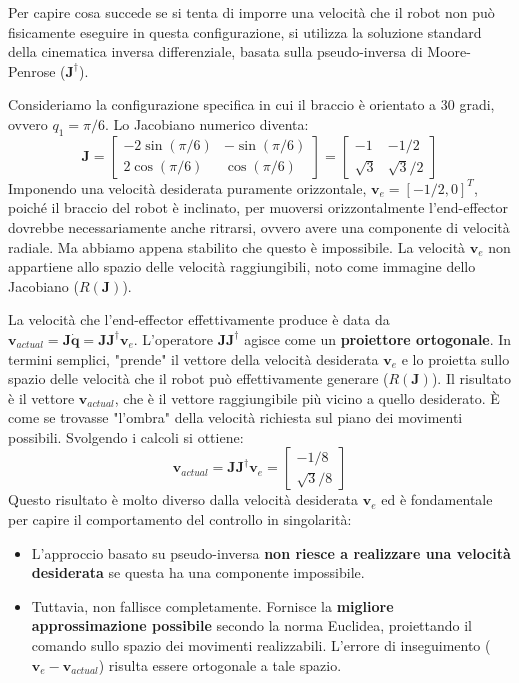 ﻿\documentclass[11pt, a4paper]{article}
\begin{document}
Per capire cosa succede se si tenta di imporre una velocità che il robot non può fisicamente eseguire in questa configurazione, si utilizza la soluzione standard della cinematica inversa differenziale, basata sulla pseudo-inversa di Moore-Penrose ($\bm{J}^\dagger$).

Consideriamo la configurazione specifica in cui il braccio è orientato a 30 gradi, ovvero $q_1 = \pi/6$. Lo Jacobiano numerico diventa:
\[
    \bm{J} = \begin{bmatrix} -2\sin(\pi/6) & -\sin(\pi/6) \\ 2\cos(\pi/6) & \cos(\pi/6) \end{bmatrix} = \begin{bmatrix} -1 & -1/2 \\ \sqrt{3} & \sqrt{3}/2 \end{bmatrix}
\]
Imponendo una velocità desiderata puramente orizzontale, $\bm{v}_e = [-1/2, 0]^T$, poiché il braccio del robot è inclinato, per muoversi orizzontalmente l'end-effector dovrebbe necessariamente anche ritrarsi, ovvero avere una componente di velocità radiale. Ma abbiamo appena stabilito che questo è impossibile. La velocità $\bm{v}_e$ non appartiene allo spazio delle velocità raggiungibili, noto come immagine dello Jacobiano ($R(\bm{J})$).

La velocità che l'end-effector effettivamente produce è data da $\bm{v}_{actual} = \bm{J}\dot{\bm{q}} = \bm{J}\bm{J}^\dagger \bm{v}_e$. L'operatore $\bm{J}\bm{J}^\dagger$ agisce come un \textbf{proiettore ortogonale}. In termini semplici, "prende" il vettore della velocità desiderata $\bm{v}_e$ e lo proietta sullo spazio delle velocità che il robot può effettivamente generare ($R(\bm{J})$). Il risultato è il vettore $\bm{v}_{actual}$, che è il vettore raggiungibile più vicino a quello desiderato. È come se trovasse "l'ombra" della velocità richiesta sul piano dei movimenti possibili.
\newpage
Svolgendo i calcoli si ottiene:
\[
    \bm{v}_{actual} = \bm{J}\bm{J}^\dagger\bm{v}_e =
    \begin{bmatrix}
        -1/8 \\
        \sqrt{3}/8
    \end{bmatrix}
\]
Questo risultato è molto diverso dalla velocità desiderata $\bm{v}_e$ ed è fondamentale per capire il comportamento del controllo in singolarità:
\begin{itemize}
    \item L'approccio basato su pseudo-inversa \textbf{non riesce a realizzare una velocità desiderata} se questa ha una componente impossibile.
    \item Tuttavia, non fallisce completamente. Fornisce la \textbf{migliore approssimazione possibile} secondo la norma Euclidea, proiettando il comando sullo spazio dei movimenti realizzabili. L'errore di inseguimento ($\bm{v}_e - \bm{v}_{actual}$) risulta essere ortogonale a tale spazio.
\end{itemize}
\end{document}

